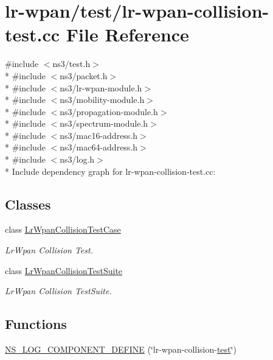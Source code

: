 \hypertarget{lr-wpan-collision-test_8cc}{}\section{lr-\/wpan/test/lr-\/wpan-\/collision-\/test.cc File Reference}
\label{lr-wpan-collision-test_8cc}
{\ttfamily \#include $<$ns3/test.\+h$>$}\\*
{\ttfamily \#include $<$ns3/packet.\+h$>$}\\*
{\ttfamily \#include $<$ns3/lr-\/wpan-\/module.\+h$>$}\\*
{\ttfamily \#include $<$ns3/mobility-\/module.\+h$>$}\\*
{\ttfamily \#include $<$ns3/propagation-\/module.\+h$>$}\\*
{\ttfamily \#include $<$ns3/spectrum-\/module.\+h$>$}\\*
{\ttfamily \#include $<$ns3/mac16-\/address.\+h$>$}\\*
{\ttfamily \#include $<$ns3/mac64-\/address.\+h$>$}\\*
{\ttfamily \#include $<$ns3/log.\+h$>$}\\*
Include dependency graph for lr-\/wpan-\/collision-\/test.cc\+:
\subsection*{Classes}
\begin{DoxyCompactItemize}
\item 
class \hyperlink{classLrWpanCollisionTestCase}{Lr\+Wpan\+Collision\+Test\+Case}
\begin{DoxyCompactList}\small\item\em Lr\+Wpan Collision Test. \end{DoxyCompactList}\item 
class \hyperlink{classLrWpanCollisionTestSuite}{Lr\+Wpan\+Collision\+Test\+Suite}
\begin{DoxyCompactList}\small\item\em Lr\+Wpan Collision Test\+Suite. \end{DoxyCompactList}\end{DoxyCompactItemize}
\subsection*{Functions}
\begin{DoxyCompactItemize}
\item 
\hyperlink{lr-wpan-collision-test_8cc_a90fece1471e54cdb18f42e8aca7acb82}{N\+S\+\_\+\+L\+O\+G\+\_\+\+C\+O\+M\+P\+O\+N\+E\+N\+T\+\_\+\+D\+E\+F\+I\+NE} (\char`\"{}lr-\/wpan-\/collision-\/\hyperlink{main-test-sync_8cc_a708a4c1a4d0c4acc4c447310dd4db27f}{test}\char`\"{})
\end{DoxyCompactItemize}
